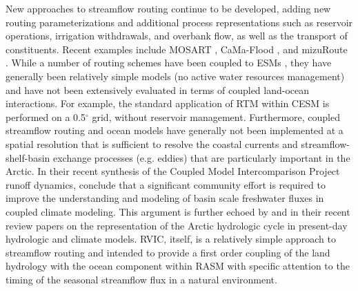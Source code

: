 \documentclass[jgrga, draft]{agutex}
\begin{document}
\begin{article}
New approaches to streamflow routing continue to be developed, adding new routing parameterizations and additional process representations such as reservoir operations, irrigation withdrawals, and overbank flow, as well as the transport of constituents.
Recent examples include MOSART \citep{Li_2013}, CaMa-Flood \citep{Yamazaki_2009,Yamazaki_2014}, and mizuRoute \citep{Clark_2016}.
While a number of routing schemes have been coupled to ESMs \citep[e.g.][]{Olivera_2000,Sushama_2004}, they have generally been relatively simple models (no active water resources management) and have not been extensively evaluated in terms of coupled land-ocean interactions.
For example, the standard application of RTM within CESM is performed on a 0.5$^{\circ}$ grid, without reservoir management.
Furthermore, coupled streamflow routing and ocean models have generally not been implemented at a spatial resolution that is sufficient to resolve the coastal currents and streamflow-shelf-basin exchange processes (e.g. eddies) that are particularly important in the Arctic.
In their recent synthesis of the Coupled Model Intercomparison Project \citep[CMIP5; ][]{Taylor_2012} runoff dynamics, \citet{Bring_2015} conclude that a significant community effort is required to improve the understanding and modeling of basin scale freshwater fluxes in coupled climate modeling.
This argument is further echoed by \citet{Lique_2015} and \citet{Bring_2016} in their recent review papers on the representation of the Arctic hydrologic cycle in present-day hydrologic and climate models.
RVIC, itself, is a relatively simple approach to streamflow routing and intended to provide a first order coupling of the land hydrology with the ocean component within RASM with specific attention to the timing of the seasonal streamflow flux in a natural environment.


\end{article}
\end{document}
